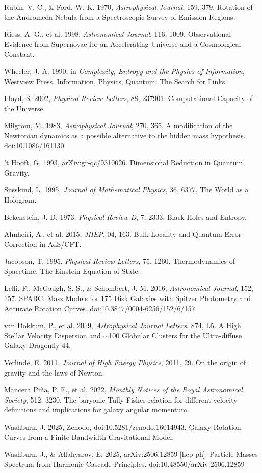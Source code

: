 \documentclass[usenatbib]{mnras}
\begin{document}
\begin{thebibliography}{99}
 Rubin, V. C., \& Ford, W. K. 1970, \textit{Astrophysical Journal}, 159, 379. Rotation of the Andromeda Nebula from a Spectroscopic Survey of Emission Regions.

 Riess, A. G., et al. 1998, \textit{Astronomical Journal}, 116, 1009. Observational Evidence from Supernovae for an Accelerating Universe and a Cosmological Constant.

 Wheeler, J. A. 1990, in \textit{Complexity, Entropy and the Physics of Information}, Westview Press. Information, Physics, Quantum: The Search for Links.

 Lloyd, S. 2002, \textit{Physical Review Letters}, 88, 237901. Computational Capacity of the Universe.

 Milgrom, M. 1983, \textit{Astrophysical Journal}, 270, 365. A modification of the Newtonian dynamics as a possible alternative to the hidden mass hypothesis. doi:10.1086/161130

 't Hooft, G. 1993, arXiv:gr-qc/9310026. Dimensional Reduction in Quantum Gravity.

 Susskind, L. 1995, \textit{Journal of Mathematical Physics}, 36, 6377. The World as a Hologram.

 Bekenstein, J. D. 1973, \textit{Physical Review D}, 7, 2333. Black Holes and Entropy.

 Almheiri, A., et al. 2015, \textit{JHEP}, 04, 163. Bulk Locality and Quantum Error Correction in AdS/CFT.

 Jacobson, T. 1995, \textit{Physical Review Letters}, 75, 1260. Thermodynamics of Spacetime: The Einstein Equation of State.

 Lelli, F., McGaugh, S. S., \& Schombert, J. M. 2016, \textit{Astronomical Journal}, 152, 157. SPARC: Mass Models for 175 Disk Galaxies with Spitzer Photometry and Accurate Rotation Curves. doi:10.3847/0004-6256/152/6/157

 van Dokkum, P., et al. 2019, \textit{Astrophysical Journal Letters}, 874, L5. A High Stellar Velocity Dispersion and $\sim$100 Globular Clusters for the Ultra-diffuse Galaxy Dragonfly 44.

 Verlinde, E. 2011, \textit{Journal of High Energy Physics}, 2011, 29. On the origin of gravity and the laws of Newton.

 Mancera Piña, P. E., et al. 2022, \textit{Monthly Notices of the Royal Astronomical Society}, 512, 3230. The baryonic Tully-Fisher relation for different velocity definitions and implications for galaxy angular momentum.

 Washburn, J. 2025, Zenodo, doi:10.5281/zenodo.16014943. Galaxy Rotation Curves from a Finite-Bandwidth Gravitational Model.

 Washburn, J., \& Allahyarov, E. 2025, arXiv:2506.12859 [hep-ph]. Particle Masses Spectrum from Harmonic Cascade Principles. doi:10.48550/arXiv.2506.12859
\end{thebibliography}
\end{document}
